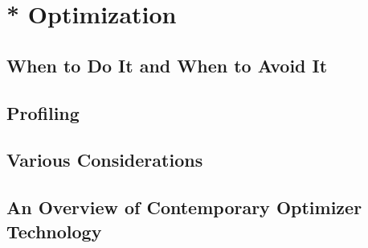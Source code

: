 
\chapter{* Optimization}
\section{When to Do It and When to Avoid It}
\section{Profiling}
\section{Various Considerations}
\section{An Overview of Contemporary Optimizer Technology}



